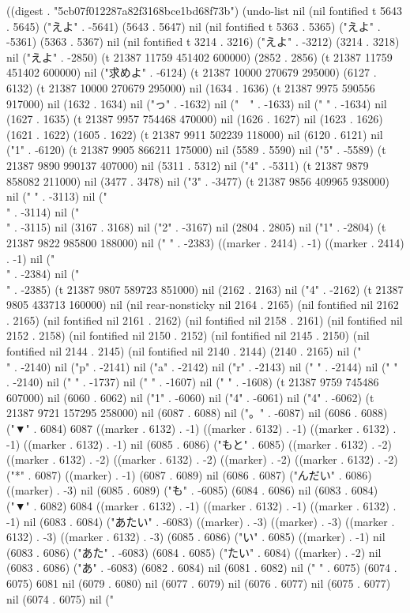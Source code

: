 
((digest . "5cb07f012287a82f3168bce1bd68f73b") (undo-list nil (nil fontified t 5643 . 5645) ("えよ" . -5641) (5643 . 5647) nil (nil fontified t 5363 . 5365) ("えよ" . -5361) (5363 . 5367) nil (nil fontified t 3214 . 3216) ("えよ" . -3212) (3214 . 3218) nil ("えよ" . -2850) (t 21387 11759 451402 600000) (2852 . 2856) (t 21387 11759 451402 600000) nil ("求めよ" . -6124) (t 21387 10000 270679 295000) (6127 . 6132) (t 21387 10000 270679 295000) nil (1634 . 1636) (t 21387 9975 590556 917000) nil (1632 . 1634) nil ("っ" . -1632) nil ("　" . -1633) nil (" " . -1634) nil (1627 . 1635) (t 21387 9957 754468 470000) nil (1626 . 1627) nil (1623 . 1626) (1621 . 1622) (1605 . 1622) (t 21387 9911 502239 118000) nil (6120 . 6121) nil ("1" . -6120) (t 21387 9905 866211 175000) nil (5589 . 5590) nil ("5" . -5589) (t 21387 9890 990137 407000) nil (5311 . 5312) nil ("4" . -5311) (t 21387 9879 858082 211000) nil (3477 . 3478) nil ("3" . -3477) (t 21387 9856 409965 938000) nil ("
" . -3113) nil ("\\" . -3114) nil ("\\" . -3115) nil (3167 . 3168) nil ("2" . -3167) nil (2804 . 2805) nil ("1" . -2804) (t 21387 9822 985800 188000) nil ("
" . -2383) ((marker . 2414) . -1) ((marker . 2414) . -1) nil ("\\" . -2384) nil ("\\" . -2385) (t 21387 9807 589723 851000) nil (2162 . 2163) nil ("4" . -2162) (t 21387 9805 433713 160000) nil (nil rear-nonsticky nil 2164 . 2165) (nil fontified nil 2162 . 2165) (nil fontified nil 2161 . 2162) (nil fontified nil 2158 . 2161) (nil fontified nil 2152 . 2158) (nil fontified nil 2150 . 2152) (nil fontified nil 2145 . 2150) (nil fontified nil 2144 . 2145) (nil fontified nil 2140 . 2144) (2140 . 2165) nil ("\\" . -2140) nil ("p" . -2141) nil ("a" . -2142) nil ("r" . -2143) nil (" " . -2144) nil ("
" . -2140) nil ("
" . -1737) nil ("
" . -1607) nil ("
" . -1608) (t 21387 9759 745486 607000) nil (6060 . 6062) nil ("1" . -6060) nil ("4" . -6061) nil ("4" . -6062) (t 21387 9721 157295 258000) nil (6087 . 6088) nil ("。" . -6087) nil (6086 . 6088) ("▼" . 6084) 6087 ((marker . 6132) . -1) ((marker . 6132) . -1) ((marker . 6132) . -1) ((marker . 6132) . -1) nil (6085 . 6086) ("もと" . 6085) ((marker . 6132) . -2) ((marker . 6132) . -2) ((marker . 6132) . -2) ((marker) . -2) ((marker . 6132) . -2) ("*" . 6087) ((marker) . -1) (6087 . 6089) nil (6086 . 6087) ("んだい" . 6086) ((marker) . -3) nil (6085 . 6089) ("も" . -6085) (6084 . 6086) nil (6083 . 6084) ("▼" . 6082) 6084 ((marker . 6132) . -1) ((marker . 6132) . -1) ((marker . 6132) . -1) nil (6083 . 6084) ("あたい" . -6083) ((marker) . -3) ((marker) . -3) ((marker . 6132) . -3) ((marker . 6132) . -3) (6085 . 6086) ("い" . 6085) ((marker) . -1) nil (6083 . 6086) ("あた" . -6083) (6084 . 6085) ("たい" . 6084) ((marker) . -2) nil (6083 . 6086) ("あ" . -6083) (6082 . 6084) nil (6081 . 6082) nil (" " . 6075) (6074 . 6075) 6081 nil (6079 . 6080) nil (6077 . 6079) nil (6076 . 6077) nil (6075 . 6077) nil (6074 . 6075) nil ("
